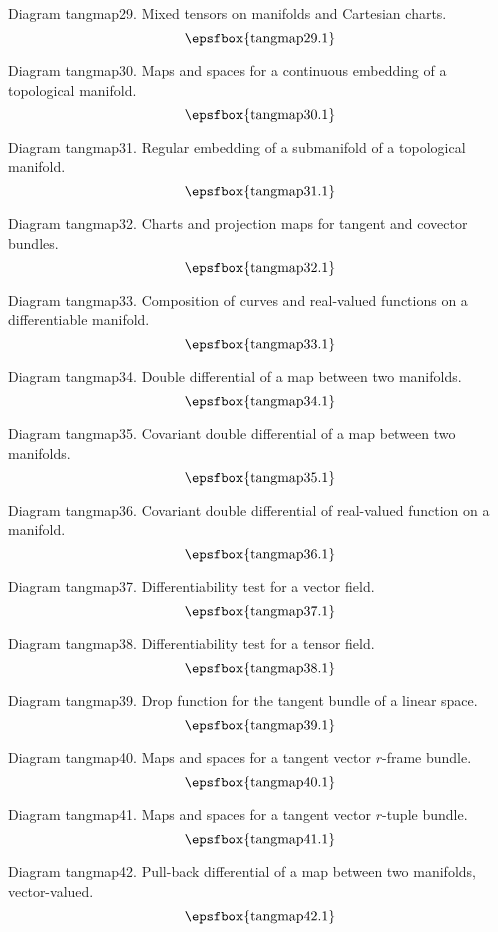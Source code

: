 Diagram tangmap29. Mixed tensors on manifolds and Cartesian charts.
$$
\centerline{\epsfbox{tangmap29.1}}
$$

Diagram tangmap30. Maps and spaces for a continuous embedding of a topological
manifold.
$$
\centerline{\epsfbox{tangmap30.1}}
$$

Diagram tangmap31. Regular embedding of a submanifold of a topological manifold.
$$
\centerline{\epsfbox{tangmap31.1}}
$$

\filleject

Diagram tangmap32. Charts and projection maps for tangent and covector bundles.
$$
\centerline{\epsfbox{tangmap32.1}}
$$

Diagram tangmap33. Composition of curves and real-valued functions on a
differentiable manifold.
$$
\centerline{\epsfbox{tangmap33.1}}
$$

Diagram tangmap34. Double differential of a map between two manifolds.
$$
\centerline{\epsfbox{tangmap34.1}}
$$

\filleject

Diagram tangmap35. Covariant double differential of a map between two manifolds.
$$
\centerline{\epsfbox{tangmap35.1}}
$$

Diagram tangmap36. Covariant double differential of real-valued function on a
manifold.
$$
\centerline{\epsfbox{tangmap36.1}}
$$

Diagram tangmap37. Differentiability test for a vector field.
$$
\centerline{\epsfbox{tangmap37.1}}
$$

Diagram tangmap38. Differentiability test for a tensor field.
$$
\centerline{\epsfbox{tangmap38.1}}
$$

\filleject

Diagram tangmap39. Drop function for the tangent bundle of a linear space.
$$
\centerline{\epsfbox{tangmap39.1}}
$$

Diagram tangmap40. Maps and spaces for a tangent vector $r$-frame bundle.
$$
\centerline{\epsfbox{tangmap40.1}}
$$

Diagram tangmap41. Maps and spaces for a tangent vector $r$-tuple bundle.
$$
\centerline{\epsfbox{tangmap41.1}}
$$

Diagram tangmap42. Pull-back differential of a map between two manifolds,
vector-valued.
$$
\centerline{\epsfbox{tangmap42.1}}
$$


